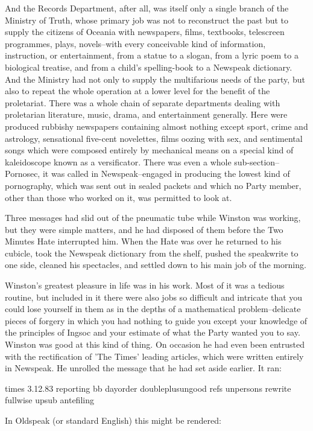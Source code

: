 \documentclass{article}
\begin{document}
And the Records Department, after all, was itself only a single branch of
the Ministry of Truth, whose primary job was not to reconstruct the past
but to supply the citizens of Oceania with newspapers, films, textbooks,
telescreen programmes, plays, novels--with every conceivable kind of
information, instruction, or entertainment, from a statue to a slogan,
from a lyric poem to a biological treatise, and from a child's
spelling-book to a Newspeak dictionary. And the Ministry had not only to
supply the multifarious needs of the party, but also to repeat the whole
operation at a lower level for the benefit of the proletariat. There
was a whole chain of separate departments dealing with proletarian
literature, music, drama, and entertainment generally. Here were produced
rubbishy newspapers containing almost nothing except sport, crime and
astrology, sensational five-cent novelettes, films oozing with sex, and
sentimental songs which were composed entirely by mechanical means on a
special kind of kaleidoscope known as a versificator. There was even
a whole sub-section--Pornosec, it was called in Newspeak--engaged in
producing the lowest kind of pornography, which was sent out in sealed
packets and which no Party member, other than those who worked on it,
was permitted to look at.

Three messages had slid out of the pneumatic tube while Winston was
working, but they were simple matters, and he had disposed of them before
the Two Minutes Hate interrupted him. When the Hate was over he returned
to his cubicle, took the Newspeak dictionary from the shelf, pushed the
speakwrite to one side, cleaned his spectacles, and settled down to his
main job of the morning.

Winston's greatest pleasure in life was in his work. Most of it was a
tedious routine, but included in it there were also jobs so difficult and
intricate that you could lose yourself in them as in the depths of a
mathematical problem--delicate pieces of forgery in which you had nothing
to guide you except your knowledge of the principles of Ingsoc and your
estimate of what the Party wanted you to say. Winston was good at this kind
of thing. On occasion he had even been entrusted with the rectification of
'The Times' leading articles, which were written entirely in Newspeak.
He unrolled the message that he had set aside earlier. It ran:


   times 3.12.83 reporting bb dayorder doubleplusungood refs unpersons
rewrite fullwise upsub antefiling


In Oldspeak (or standard English) this might be rendered:
\end{document}
